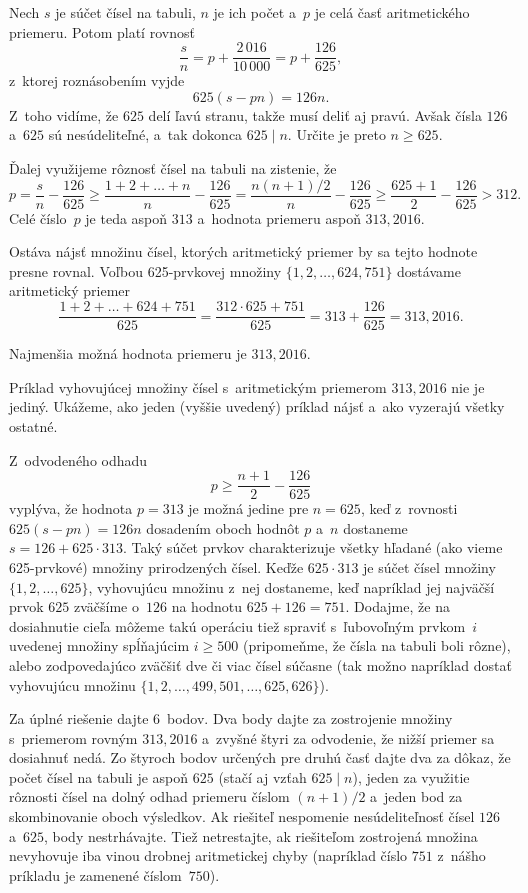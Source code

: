 {%
Nech $s$ je súčet čísel na tabuli, $n$ je ich počet a~$p$ je
celá časť aritmetického priemeru. Potom platí rovnosť
$$
\frac{s}{n}=p+\frac{2\,016}{10\,000} = p + \frac{126}{625},
$$
z~ktorej roznásobením vyjde
$$
625(s-pn)= 126n.
$$
Z~toho vidíme, že $625$ delí ľavú stranu, takže musí deliť aj pravú. Avšak
čísla $126$ a~$625$ sú nesúdeliteľné, a~tak dokonca $625 \mid n$.
Určite je preto $n \ge 625$.

Ďalej využijeme rôznosť čísel na tabuli na zistenie, že
$$
p=\frac{s}{n}-\frac{126}{625} \ge \frac{1+2+\dots+n}{n}-\frac{126}{625}
= \frac{n(n+1)/2}{n}-\frac{126}{625}
\geq \frac{625+1}{2}-\frac{126}{625}>312.
$$
Celé číslo~$p$ je teda aspoň $313$ a~hodnota priemeru aspoň
$313{,}2016$.

Ostáva nájsť množinu čísel, ktorých aritmetický priemer by sa tejto hodnote
presne rovnal. Voľbou 625-prvkovej množiny $\{1, 2,\dots, 624, 751\}$
dostávame aritmetický priemer
$$
\frac{1+2+\dots+624+751}{625}=\frac{312 \cdot 625+751}{625}=313+\frac{126}{625}=313{,}2016.
$$

\odpoved
Najmenšia možná hodnota priemeru je $313{,}2016$.

\poznamka
Príklad vyhovujúcej množiny čísel s~aritmetickým
priemerom $313{,}2016$ nie je jediný. Ukážeme, ako jeden (vyššie
uvedený) príklad nájsť a~ako vyzerajú všetky ostatné.

Z~odvodeného odhadu
$$
p\ge\frac{n+1}{2}-\frac{126}{625}
$$
vyplýva, že hodnota $p=313$ je možná jedine pre $n=625$, keď
z~rovnosti $625(s-pn)=126n$ dosadením oboch hodnôt $p$ a~$n$
dostaneme $s=126+625\cdot313$. Taký súčet prvkov charakterizuje
všetky hľadané (ako vieme 625-prvkové) množiny prirodzených čísel.
Keďže $625\cdot313$ je súčet čísel množiny $\{1,2,\dots,625\}$,
vyhovujúcu množinu z~nej dostaneme, keď napríklad jej najväčší
prvok $625$ zväčšíme o~$126$ na hodnotu $625+126=751$. Dodajme, že na dosiahnutie
cieľa môžeme takú operáciu tiež spraviť s~ľubovoľným prvkom~$i$ uvedenej množiny
spĺňajúcim $i\ge500$ (pripomeňme, že čísla na tabuli boli rôzne), alebo
zodpovedajúco zväčšiť dve či viac čísel súčasne (tak možno napríklad dostať
vyhovujúcu množinu $\{1,2,\dots,499,501,\dots,625,626\}$).


\nobreak\medskip\petit\noindent
Za úplné riešenie dajte 6~bodov.
Dva body dajte za zostrojenie množiny
s~priemerom rovným $313{,}2016$ a~zvyšné štyri za odvodenie, že
nižší priemer sa dosiahnuť nedá. Zo štyroch bodov určených pre
druhú časť dajte dva za dôkaz, že počet čísel na tabuli je
aspoň $625$ (stačí aj vzťah $625 \mid n$), jeden za využitie rôznosti
čísel na dolný odhad priemeru číslom $(n+1)/2$ a~jeden bod za skombinovanie oboch výsledkov. Ak riešiteľ
nespomenie nesúdeliteľnosť čísel $126$ a~$625$, body nestrhávajte. Tiež
netrestajte, ak riešiteľom zostrojená množina nevyhovuje iba
vinou drobnej aritmetickej chyby (napríklad číslo $751$ z~nášho príkladu
je zamenené číslom~$750$).
\endpetit
\bigbreak}

